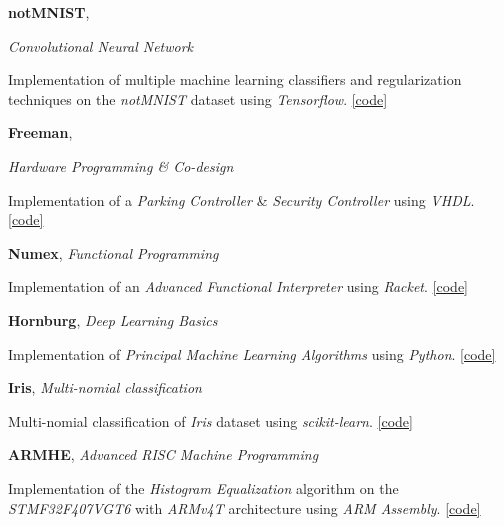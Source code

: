 \documentclass[a4paper,11pt]{article}
\begin{document}
\vspace{0.23cm}
\textbf{notMNIST}, 
{\textit{Convolutional Neural Network}
\begin{innerlist}
	\item Implementation of multiple machine learning classifiers and regularization techniques on the \textit{notMNIST} dataset using \textit{Tensorflow}. \href{https://github.com/aligholamee/notMNIST}{[code]}
\end{innerlist}

\vspace{0.23cm}
\textbf{Freeman}, 
{\textit{Hardware Programming \& Co-design}
\begin{innerlist}
	\item Implementation of a \textit{Parking Controller} \& \textit{Security Controller} using \textit{VHDL}. \href{https://github.com/aligholamee/Freeman}{[code]}
\end{innerlist}

\vspace{0.23cm}
\textbf{Numex}, 
\textit{Functional Programming}
\begin{innerlist}
	\item Implementation of an \textit{Advanced Functional Interpreter} using \textit{Racket}. \href{https://github.com/aligholamee/NUMEX}{[code]}
\end{innerlist}

\vspace{0.23cm}
\textbf{Hornburg}, 
\textit{Deep Learning Basics}
\begin{innerlist}
	\item Implementation of \textit{Principal Machine Learning Algorithms} using \textit{Python}. \href{https://github.com/aligholamee/Hornburg}{[code]}
\end{innerlist}

\vspace{0.23cm}
\textbf{Iris}, 
\textit{Multi-nomial classification}
\begin{innerlist}
	\item Multi-nomial classification of \textit{Iris} dataset using \textit{scikit-learn}. \href{https://github.com/aligholamee/IRIS}{[code]}
\end{innerlist}

\vspace{0.23cm}
\textbf{ARMHE}, 
\textit{Advanced RISC Machine Programming}
\begin{innerlist}
	\item Implementation of the \textit{Histogram Equalization} algorithm on the \textit{STMF32F407VGT6} with \textit{ARMv4T} architecture using \textit{ARM Assembly}. \href{https://github.com/aligholamee/ARMHE}{[code]}
\end{innerlist}

}}
\end{document}

